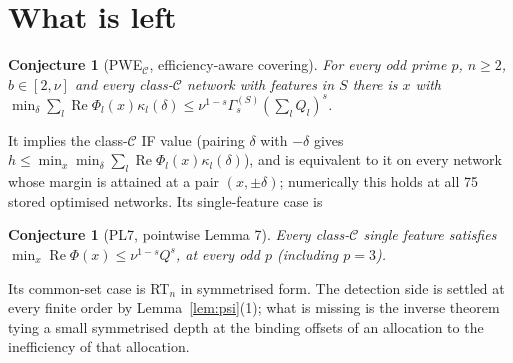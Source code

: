 \documentclass[11pt]{article}
\newtheorem{conjecture}[theorem]{Conjecture}
\theoremstyle{remark}
\renewcommand{\Re}{\operatorname{Re}}
\begin{document}
\section{What is left}
\begin{conjecture}[PWE$_{\mathcal C}$, efficiency-aware covering]
For every odd prime $p$, $n\ge2$, $b\in[2,\nu]$ and every class-$\mathcal C$ network with features in $S$ there is $x$ with
$\min_\delta\sum_l\Re\Phi_l(x)\kappa_l(\delta)\le\nu^{1-s}\Gamma^{(S)}_s(\sum_lQ_l)^s$.
\end{conjecture}
\noindent It implies the class-$\mathcal C$ IF value (pairing $\delta$ with $-\delta$ gives $h\le\min_x\min_\delta\sum_l\Re\Phi_l(x)\kappa_l(\delta)$), and is
equivalent to it on every network whose margin is attained at a pair $(x,\pm\delta)$; numerically this holds at all 75 stored optimised networks.
Its single-feature case is
\begin{conjecture}[PL7, pointwise Lemma 7]
Every class-$\mathcal C$ single feature satisfies $\min_x\Re\Phi(x)\le\nu^{1-s}Q^s$, at every odd $p$ (including $p=3$).
\end{conjecture}
\noindent Its common-set case is RT$_n$ in symmetrised form. The detection side is settled at every finite order by Lemma~\ref{lem:psi}(1);
what is missing is the inverse theorem tying a small symmetrised depth at the binding offsets of an allocation to the inefficiency of that allocation.
\end{document}
